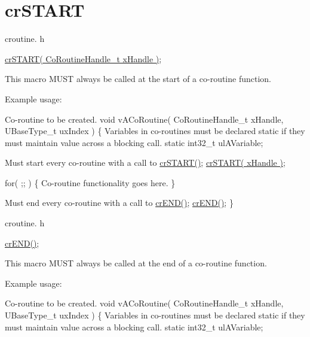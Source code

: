 \hypertarget{group__crSTART}{\section{cr\-S\-T\-A\-R\-T}
\label{group__crSTART}
}
croutine. h 
\begin{DoxyPre}
 \hyperlink{croutine_8h_a19a57a201a325e8af1207ed68c4aedde}{crSTART( CoRoutineHandle\_t xHandle )};\end{DoxyPre}


This macro M\-U\-S\-T always be called at the start of a co-\/routine function.

Example usage\-: 
\begin{DoxyPre}
Co-routine to be created.
 void vACoRoutine( CoRoutineHandle\_t xHandle, UBaseType\_t uxIndex )
 \{
Variables in co-routines must be declared static if they must maintain value across a blocking call.
 static int32\_t ulAVariable;\end{DoxyPre}



\begin{DoxyPre}Must start every co-routine with a call to \hyperlink{croutine_8h_a19a57a201a325e8af1207ed68c4aedde}{crSTART()};
     \hyperlink{croutine_8h_a19a57a201a325e8af1207ed68c4aedde}{crSTART( xHandle )};\end{DoxyPre}



\begin{DoxyPre}     for( ;; )
     \{
Co-routine functionality goes here.
     \}\end{DoxyPre}



\begin{DoxyPre}Must end every co-routine with a call to \hyperlink{croutine_8h_ae6038cc976689b50000475ebfc4e2f23}{crEND()};
     \hyperlink{croutine_8h_ae6038cc976689b50000475ebfc4e2f23}{crEND()};
 \}\end{DoxyPre}


croutine. h 
\begin{DoxyPre}
 \hyperlink{croutine_8h_ae6038cc976689b50000475ebfc4e2f23}{crEND()};\end{DoxyPre}


This macro M\-U\-S\-T always be called at the end of a co-\/routine function.

Example usage\-: 
\begin{DoxyPre}
Co-routine to be created.
 void vACoRoutine( CoRoutineHandle\_t xHandle, UBaseType\_t uxIndex )
 \{
Variables in co-routines must be declared static if they must maintain value across a blocking call.
 static int32\_t ulAVariable;\end{DoxyPre}



